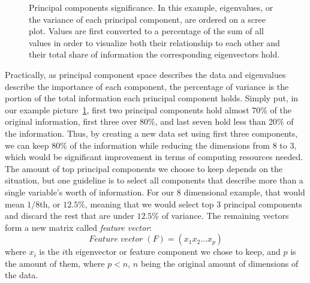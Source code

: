 \begin{figure}[htb]
    \centering
\caption{Principal components significance.
In this example, eigenvalues, or the variance of each principal component,
    are ordered on a scree plot.
    Values are first converted to a percentage of the sum of all values
    in order to visualize both their relationship to each other
    and their total share of information the corresponding eigenvectors hold.
    \label{fig:pc-variance-values}}
\end{figure}

Practically,
as principal component space describes the data
and eigenvalues describe the importance of each component,
the percentage of variance is the portion of the total information each principal component holds.
Simply put,
in our example picture~\ref{fig:pc-variance-values},
first two principal components hold almost 70\% of the original information,
first three over 80\%,
and last seven hold less than 20\% of the information.
Thus,
by creating a new data set using first three components,
we can keep 80\% of the information
while reducing the dimensions from 8 to 3,
which would be significant improvement
in terms of computing resources needed.
The amount of top principal components we choose to keep
depends on the situation,
but one guideline is to select all components
that describe more than a single variable's worth of information.
For our 8 dimensional example,
that would mean $1/8$th, or $12.5\%$,
meaning that we would select top 3 principal components
and discard the rest that are under $12.5\%$ of variance.
The remaining vectors form a new matrix
called \textit{feature vector}:
\begin{equation}
    Feature\; vector\; (F) = (x_{1} x_{2} ... x_{p})
\end{equation}
where $x_{i}$ is the $i$th eigenvector or feature component we chose to keep,
and $p$ is the amount of them, where $p<n$, $n$ being the original amount of dimensions of the data.

